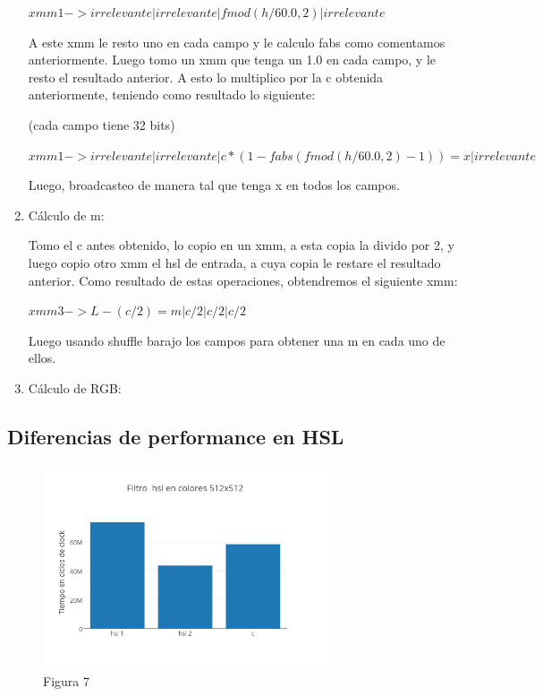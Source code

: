 \documentclass[a4paper]{article}
\begin{document}
\begin{enumerate}
\vspace*{0.3cm}	

$xmm1 -> irrelevante|irrelevante|fmod(h/60.0 , 2)|irrelevante$ 		
		
\vspace*{0.3cm}		
		
	A este xmm le resto uno en cada campo y le calculo fabs como comentamos anteriormente. Luego tomo un xmm que tenga un 1.0 en cada campo, y le resto el resultado anterior. A esto lo multiplico por la c obtenida anteriormente, teniendo como resultado lo siguiente:
	
\vspace*{0.3cm}

(cada campo tiene 32 bits)	
	
\vspace*{0.3cm}	

	$xmm1 -> irrelevante|irrelevante|c*(1-fabs(fmod(h/60.0 , 2) -1))=x|irrelevante$
		
\vspace*{0.3cm}
	
Luego, broadcasteo de manera tal que tenga x en todos los campos.	
	
	\item Cálculo de m:
	
Tomo el c antes obtenido, lo copio en un xmm, a esta copia la divido por 2, y luego copio otro xmm el hsl de entrada, a cuya copia le restare el resultado anterior. Como resultado de estas operaciones, obtendremos el siguiente xmm:

$xmm3 -> L-(c/2)=m | c/2 | c/2 | c/2$
	
	Luego usando shuffle barajo los campos para obtener una m en cada uno de ellos.
	
	\item Cálculo de RGB:
	
		
	
\end{enumerate}

\subsection{Diferencias de performance en HSL}

\begin{figure}[h]
  \centering
    \includegraphics[width=0.75\textwidth]{imagenes/FiltroHslEnColores512x512.png}
  \caption{Figura 7}
  \label{fig:graficohsl1}
\end{figure}
 \FloatBarrier
\end{document}

